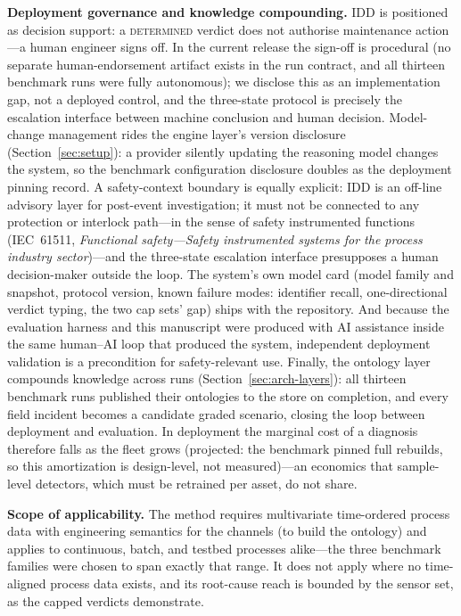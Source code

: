 \documentclass[preprint,10pt]{elsarticle}
\begin{document}
\textbf{Deployment governance and knowledge compounding.} IDD is positioned as decision support: a \mbox{\textsc{determined}} verdict does not authorise maintenance action---a human engineer signs off. In the current release the sign-off is procedural (no separate human-endorsement artifact exists in the run contract, and all thirteen benchmark runs were fully autonomous); we disclose this as an implementation gap, not a deployed control, and the three-state protocol is precisely the escalation interface between machine conclusion and human decision. Model-change management rides the engine layer's version disclosure (Section~\ref{sec:setup}): a provider silently updating the reasoning model changes the system, so the benchmark configuration disclosure doubles as the deployment pinning record. A safety-context boundary is equally explicit: IDD is an off-line advisory layer for post-event investigation; it must not be connected to any protection or interlock path---in the sense of safety instrumented functions (IEC~61511, \emph{Functional safety---Safety instrumented systems for the process industry sector})---and the three-state escalation interface presupposes a human decision-maker outside the loop. The system's own model card (model family and snapshot, protocol version, known failure modes: identifier recall, one-directional verdict typing, the two cap sets' gap) ships with the repository. And because the evaluation harness and this manuscript were produced with AI assistance inside the same human--AI loop that produced the system, independent deployment validation is a precondition for safety-relevant use. Finally, the ontology layer compounds knowledge across runs (Section~\ref{sec:arch-layers}): all thirteen benchmark runs published their ontologies to the store on completion, and every field incident becomes a candidate graded scenario, closing the loop between deployment and evaluation. In deployment the marginal cost of a diagnosis therefore falls as the fleet grows (projected: the benchmark pinned full rebuilds, so this amortization is design-level, not measured)---an economics that sample-level detectors, which must be retrained per asset, do not share.

\textbf{Scope of applicability.} The method requires multivariate time-ordered process data with engineering semantics for the channels (to build the ontology) and applies to continuous, batch, and testbed processes alike---the three benchmark families were chosen to span exactly that range. It does not apply where no time-aligned process data exists, and its root-cause reach is bounded by the sensor set, as the capped verdicts demonstrate.
\end{document}
